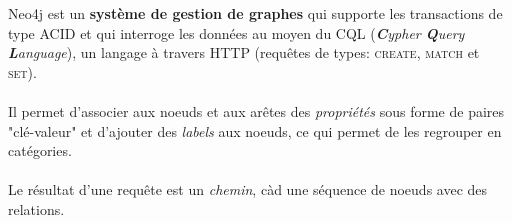 \item{}
{\vrai}
{Neo4j est un \textbf{système de gestion de graphes} qui supporte les transactions de type ACID et qui interroge les données au moyen du CQL (\textit{\textbf{C}ypher \textbf{Q}uery \textbf{L}anguage}), un langage à travers HTTP (requêtes de types: \textsc{create}, \textsc{match} et \textsc{set}).
\paragraph{}
Il permet d'associer aux noeuds et aux arêtes des \textit{propriétés} sous forme de paires "clé-valeur" et d'ajouter des \textit{labels} aux noeuds, ce qui permet de les regrouper en catégories.
\paragraph{}
Le résultat d'une requête est un \textit{chemin}, càd une séquence de noeuds avec des relations.
}